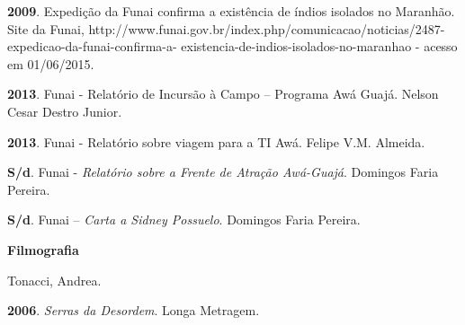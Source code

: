 \textbf{2009}. Expedição da Funai confirma a existência de índios
isolados no Maranhão. Site da Funai,
http://www.funai.gov.br/index.php/comunicacao/noticias/2487-expedicao-da-funai-confirma-a-
existencia-de-indios-isolados-no-maranhao - acesso em 01/06/2015.

\textbf{2013}. Funai - Relatório de Incursão à Campo -- Programa Awá
Guajá. Nelson Cesar Destro Junior.

\textbf{2013}. Funai - Relatório sobre viagem para a TI Awá. Felipe V.M.
Almeida.

\textbf{S/d}. Funai - \emph{Relatório sobre a Frente de Atração
Awá-Guajá}. Domingos Faria Pereira.

\textbf{S/d}. Funai -- \emph{Carta a Sidney Possuelo}. Domingos Faria
Pereira.

\textbf{Filmografia}

Tonacci, Andrea.

\textbf{2006}. \emph{Serras da Desordem}. Longa Metragem.
